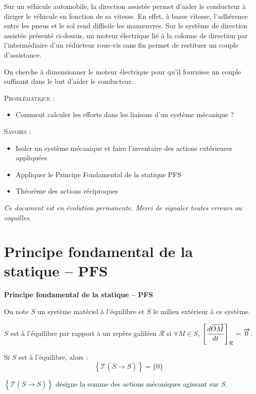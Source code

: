 \documentclass[11pt,oneside]{article}
\begin{document}
Sur un véhicule automobile, la direction assistée permet d'aider le conducteur à diriger le véhicule en fonction de sa vitesse. En effet, à basse vitesse, l'adhérence entre les pneus et le sol rend difficile les manœuvres. Sur le système de direction assistée présenté ci-dessus, un moteur électrique lié à la colonne de direction par l'intermédiaire d'un réducteur roue-vis sans fin permet de restituer un couple d'assistance. 

On cherche à dimensionner le moteur électrique pour qu'il fournisse un couple suffisant dans le but d'aider le conducteur. 

\begin{prob}
\textsc{Problématique :}
\begin{itemize}
\item Comment calculer les efforts dans les liaisons d'un système mécanique ?
\end{itemize}
\end{prob}

\begin{savoir}
\textsc{Savoirs :}
\begin{itemize}
\item Isoler un système mécanique et faire l'inventaire des actions extérieures appliquées 
\item Appliquer le Principe Fondamental de la statique PFS
\item Théorème des actions réciproques
\end{itemize}
\end{savoir}

\setlength{\parskip}{0ex plus 0.2ex minus 0ex}
 \renewcommand{\contentsname}{}
 \renewcommand{\baselinestretch}{1}

\tableofcontents

 \renewcommand{\baselinestretch}{1.2}
\setlength{\parskip}{2ex plus 0.5ex minus 0.2ex}

\textit{Ce document est en évolution permanente. Merci de signaler toutes
erreurs ou coquilles.}

\section{Principe fondamental de la statique -- PFS}
\begin{theo}
\textbf{Principe fondamental de la statique -- PFS}

On note $S$ un système matériel à l'équilibre et $\overline{S}$ le milieu extérieur à ce système.

$S$ est à l'équilibre par rapport à un repère galiléen $\mathcal{R}$ si $\forall M \in S$, $\left[\dfrac{d\overrightarrow{OM}}{dt}\right]_{\mathcal{R}}=\overrightarrow{0}$.

Si $S$ est à l'équilibre, alors : 
$$
\left\{ \mathcal{T} \left( \overline{S} \rightarrow  S\right)\right\} =\{0\}
$$

$\left\{ \mathcal{T}\left( \overline{S} \rightarrow  S\right)\right\}$ désigne la somme des actions mécaniques agissant sur $S$.
\end{theo}
\end{document}
